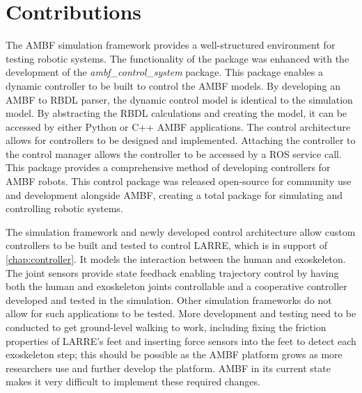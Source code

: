 \section{Contributions}

The AMBF simulation framework provides a well-structured environment for testing robotic systems. The functionality of the package was enhanced with the development of the \textit{ambf\_control\_system} package. This package enables a dynamic controller to be built to control the AMBF models. By developing an AMBF to RBDL parser, the dynamic control model is identical to the simulation model. By abstracting the RBDL calculations and creating the model, it can be accessed by either Python or C++ AMBF applications. The control architecture allows for controllers to be designed and implemented. Attaching the controller to the control manager allows the controller to be accessed by a ROS service call. This package provides a comprehensive method of developing controllers for AMBF robots. This control package was released open-source for community use and development alongside AMBF, creating a total package for simulating and controlling robotic systems.   

The simulation framework and newly developed control architecture allow custom controllers to be built and tested to control LARRE, which is in support of \autoref{chap:controller}. It models the interaction between the human and exoskeleton. The joint sensors provide state feedback enabling trajectory control by having both the human and exoskeleton joints controllable and a cooperative controller developed and tested in the simulation. Other simulation frameworks do not allow for such applications to be tested. More development and testing need to be conducted to get ground-level walking to work, including fixing the friction properties of LARRE's feet and inserting force sensors into the feet to detect each exoskeleton step; this should be possible as the AMBF platform grows as more researchers use and further develop the platform. AMBF in its current state makes it very difficult to implement these required changes.   








